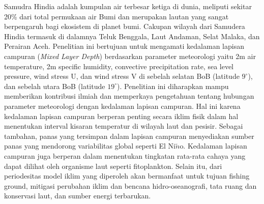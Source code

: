 \begin{spacing}{1.5}
	\pagestyle{empty}
	\begin{center}
		\vskip 1cm
		\justifying
		Samudra Hindia adalah kumpulan air terbesar ketiga di dunia, meliputi sekitar 20\% dari total permukaan air Bumi dan merupakan lautan yang sangat berpengaruh bagi ekosistem di planet bumi. Cakupan wilayah dari Samudera Hindia termasuk di dalamnya Teluk Benggala, Laut Andaman, Selat Malaka, dan Perairan Aceh. Penelitian ini bertujuan untuk mengamati kedalaman lapisan campuran (\textit{Mixed Layer Depth}) berdasarkan parameter meteorologi yaitu 2m air temperature, 2m specific humidity, convective precipitation rate, sea level pressure, wind stress U, dan wind stress V di sebelah selatan BoB (latitude $9^\circ$), dan sebelah utara BoB (latitude $19^\circ$). Penelitian ini diharapkan mampu memberikan kontribusi ilmiah dan memperkaya pengetahuan tentang hubungan parameter meteorologi dengan kedalaman lapisan campuran. Hal ini karena kedalaman lapisan campuran berperan penting secara iklim fisik dalam hal menentukan interval kisaran temperatur di wilayah laut dan pesisir. Sebagai tambahan, panas yang tersimpan dalam lapisan campuran menyediakan sumber panas yang mendorong variabilitas global seperti El Ni$\tilde{n}$o. Kedalaman lapisan campuran juga berperan dalam menentukan tingkatan rata-rata cahaya yang dapat dilihat oleh organisme laut seperti fitoplankton. Selain itu, dari periodesitas model iklim yang diperoleh akan bermanfaat untuk tujuan fishing ground, mitigasi perubahan iklim dan bencana hidro-oseanografi, tata ruang dan konservasi laut, dan sumber energi terbarukan.
	\end{center}
\end{spacing}
\pagestyle{empty}